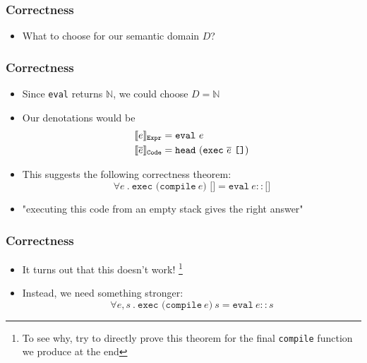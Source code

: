 \documentclass[usenames,dvipsnames]{beamer}
\newcommand{\compile}{\texttt{compile}}
\newcommand{\denot}[2][]{\llbracket #2 \rrbracket_{#1}}
\newcommand{\N}{\mathbb{N}}
\begin{document}

\begin{frame}[fragile]
  \frametitle{Correctness}

  \begin{itemize}
    \item What to choose for our semantic domain $D$?
  \end{itemize}
\end{frame}


\begin{frame}[fragile]
  \frametitle{Correctness}

  \begin{itemize}
    \item Since \texttt{eval} returns $\N$, we could choose $D = \N$

    \item Our denotations would be
      \begin{align*}
        \denot[\Expr]{e} &= \texttt{eval}\ e \\
        \denot[\texttt{Code}]{\overline{e}} &=
          \texttt{head}\ (\texttt{exec}\ \overline{e}\ \texttt{[]})
      \end{align*}

    \item This suggests the following correctness theorem:
      \begin{equation}
        \forall e\ .\ \texttt{exec (compile}\ e\texttt{) []} =
        \texttt{eval}\ e :: \texttt{[]}
      \end{equation}

    \item "executing this code from an empty stack gives the right answer"
  \end{itemize}
\end{frame}


\begin{frame}[fragile]
  \frametitle{Correctness}

  \begin{itemize}
    \item It turns out that this doesn't work!
      \footnote{To see why, try to directly prove this theorem for the final
      \compile{} function we produce at the end}

    \item Instead, we need something stronger:
      \begin{equation}\label{correctness}
        \forall e, s\ .\ \texttt{exec (compile}\ e\texttt{)}\ s =
        \texttt{eval}\ e :: s
      \end{equation}
  \end{itemize}
\end{frame}
\end{document}
